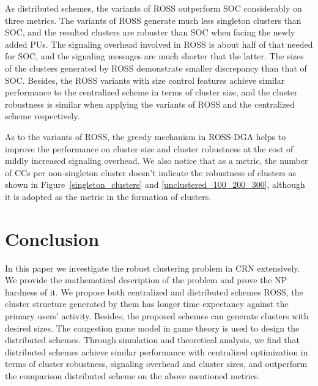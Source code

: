 \documentclass[10pt,journal,compsoc]{IEEEtran}
\theoremstyle{mytheoremstyle}
\theoremstyle{mytheoremstyle}
\theoremstyle{mytheoremstyle}
\begin{document}
As distributed schemes, the variants of ROSS outperform SOC considerably on three metrics.
The variants of ROSS generate much less singleton clusters than SOC, and the resulted clusters are robuster than SOC when facing the newly added PUs.
The signaling overhead involved in ROSS is about half of that needed for SOC, and the signaling messages are much shorter that the latter.
The sizes of the clusters generated by ROSS demonstrate smaller discrepancy than that of SOC.
Besides, the ROSS variants with size control features achieve similar performance to the centralized scheme in terms of cluster size, and the cluster robustness is similar when applying the variants of ROSS and the centralized scheme respectively.

As to the variants of ROSS, the greedy mechanism in ROSS-DGA helps to improve the performance on cluster size and cluster robustness at the cost of mildly increased signaling overhead.
We also notice that  as a metric, the number of CCs per non-singleton cluster doesn't indicate the robustness of clusters as shown in Figure~\ref{singleton_clusters} and \ref{unclustered_100_200_300}, although it is adopted as the metric in the formation of clusters.





\section{Conclusion}
\label{conclusion}
In this paper we investigate the robust clustering problem in CRN extensively.
We provide the mathematical description of the problem and prove the NP hardness of it.
We propose both centralized and distributed schemes ROSS, the cluster structure generated by them has longer time expectancy against the primary users' activity.
Besides, the proposed schemes can generate clusters with desired sizes.
The congestion game model in game theory is used to design the distributed schemes.
Through simulation and theoretical analysis, we find that distributed schemes achieve similar performance with centralized optimization in terms of cluster robustness, signaling overhead and cluster sizes, and outperform the comparison distributed scheme on the above mentioned metrics.
\end{document}
